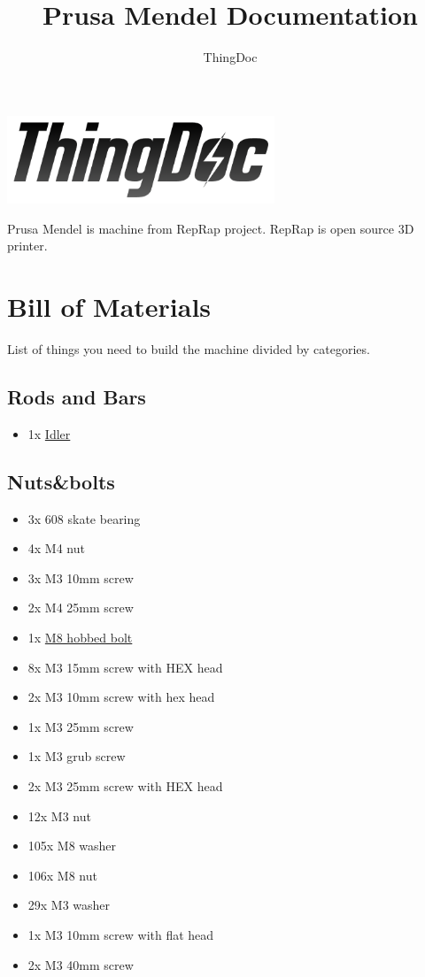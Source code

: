 \documentclass[11pt]{article}
\title{Prusa Mendel Documentation}
\author{ThingDoc}
\begin{document}
\maketitle
\begin{center}
\includegraphics[width=8cm]{logo.png}
\end{center}
Prusa Mendel is machine from RepRap project. RepRap is open source 3D printer.

\newpage

\tableofcontents

\newpage

\section{Bill of Materials}
List of things you need to build the machine divided by categories.

\subsection{Rods and Bars}
\begin{itemize}
\item 1x \hyperlink{thing_idler-m8-piece}{Idler}
\end{itemize}

\subsection{Nuts\&bolts}
\begin{itemize}
\item 3x 608 skate bearing
\item 4x M4 nut
\item 3x M3 10mm screw
\item 2x M4 25mm screw
\item 1x \hyperlink{thing_hobbed-bolt}{M8 hobbed bolt}
\item 8x M3 15mm screw with HEX head
\item 2x M3 10mm screw with hex head
\item 1x M3 25mm screw
\item 1x M3 grub screw
\item 2x M3 25mm screw with HEX head
\item 12x M3 nut
\item 105x M8 washer
\item 106x M8 nut
\item 29x M3 washer
\item 1x M3 10mm screw with flat head
\item 2x M3 40mm screw
\end{itemize}
\end{document}
